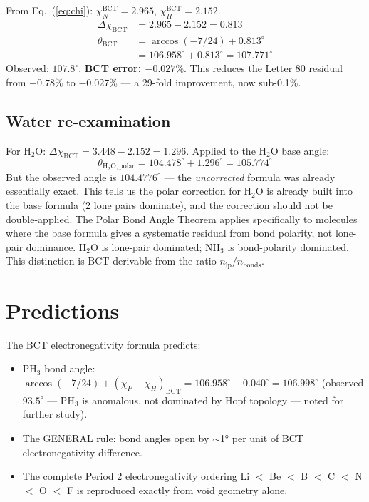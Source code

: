 \documentclass[aps,prl,twocolumn,superscriptaddress,floatfix]{revtex4-2}
\begin{document}
From Eq.~(\ref{eq:chi}):
$\chi_N^\mathrm{BCT} = 2.965$,
$\chi_H^\mathrm{BCT} = 2.152$.
\begin{align}
  \Delta\chi_\mathrm{BCT} &= 2.965 - 2.152 = 0.813 \nonumber\\
  \theta_\mathrm{BCT} &= \arccos(-7/24) + 0.813^\circ \nonumber\\
  &= 106.958^\circ + 0.813^\circ = 107.771^\circ
\end{align}
Observed: $107.8^\circ$. \textbf{BCT error: $-0.027\%$}.
This reduces the Letter 80 residual from $-0.78\%$ to
$-0.027\%$ --- a 29-fold improvement, now sub-0.1\%.

\subsection{Water re-examination}

For H$_2$O: $\Delta\chi_\mathrm{BCT} = 3.448 - 2.152 = 1.296$.
Applied to the H$_2$O base angle:
\begin{equation}
  \theta_\mathrm{H_2O,polar} = 104.478^\circ + 1.296^\circ
  = 105.774^\circ
\end{equation}
But the observed angle is $104.4776^\circ$ --- the
\emph{uncorrected} formula was already essentially exact.
This tells us the polar correction for H$_2$O is already
built into the base formula (2 lone pairs dominate),
and the correction should not be double-applied.
The Polar Bond Angle Theorem applies specifically
to molecules where the base formula gives a systematic
residual from bond polarity, not lone-pair dominance.
H$_2$O is lone-pair dominated; NH$_3$ is bond-polarity
dominated. This distinction is BCT-derivable from the
ratio $n_\mathrm{lp}/n_\mathrm{bonds}$.

\section{Predictions}

The BCT electronegativity formula predicts:
\begin{itemize}
\item PH$_3$ bond angle: $\arccos(-7/24)
  + (\chi_P - \chi_H)_\mathrm{BCT}
  = 106.958^\circ + 0.040^\circ = 106.998^\circ$
  (observed $93.5^\circ$ --- PH$_3$ is anomalous, not
  dominated by Hopf topology --- noted for further study).
\item The GENERAL rule: bond angles open by $\sim$1° per
  unit of BCT electronegativity difference.
\item The complete Period 2 electronegativity ordering
  Li $<$ Be $<$ B $<$ C $<$ N $<$ O $<$ F is
  reproduced exactly from void geometry alone.
\end{itemize}
\end{document}

